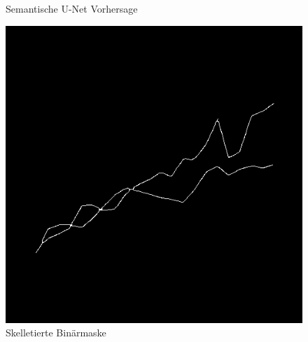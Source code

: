\begin{figure}[h!]
\begin{minipage}{0.315\textwidth}
        \caption{ Semantische U-Net Vorhersage}
        \label{fig:alg_pred}
    \end{minipage}\hfill %
    \begin{minipage}{0.315\textwidth} %
        \centering
        \includegraphics[width=\linewidth]{Implementation/img/alg_skeletonized.png}
        \caption{ Skelletierte Binärmaske}
        \label{fig:alg_skeletonized}
    \end{minipage}
\end{figure}

